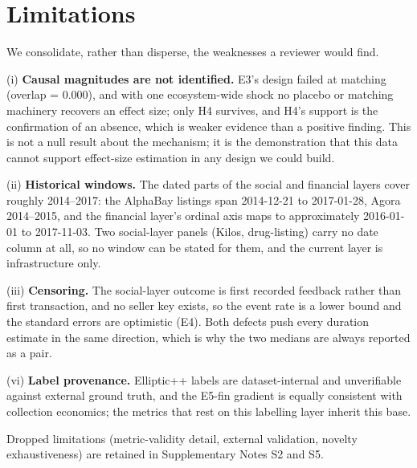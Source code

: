 \section{Limitations}

We consolidate, rather than disperse, the weaknesses a reviewer would find.

(i) \textbf{Causal magnitudes are not identified.} E3's design failed at matching
(overlap = 0.000), and with one ecosystem-wide shock no placebo or matching
machinery recovers an effect size; only H4 survives, and H4's support is the
confirmation of an absence, which is weaker evidence than a positive finding.
This is not a null result about the mechanism; it is the demonstration that this
data cannot support effect-size estimation in any design we could build.

(ii) \textbf{Historical windows.} The dated parts of the social and financial
layers cover roughly 2014--2017: the AlphaBay listings span 2014-12-21 to
2017-01-28, Agora 2014--2015, and the financial layer's ordinal axis maps to
approximately 2016-01-01 to 2017-11-03. Two social-layer panels (Kilos,
drug-listing) carry no date column at all, so no window can be stated for them,
and the current layer is infrastructure only.

(iii) \textbf{Censoring.} The social-layer outcome is first recorded feedback
rather than first transaction, and no seller key exists, so the event rate is a
lower bound and the standard errors are optimistic (E4). Both defects push every
duration estimate in the same direction, which is why the two medians are always
reported as a pair.

(vi) \textbf{Label provenance.} Elliptic++ labels are dataset-internal and
unverifiable against external ground truth, and the E5-fin gradient is equally
consistent with collection economics; the metrics that rest on this labelling
layer inherit this base.

Dropped limitations (metric-validity detail, external validation, novelty
exhaustiveness) are retained in Supplementary Notes S2 and S5.
